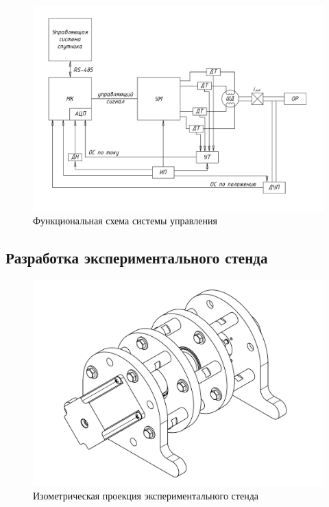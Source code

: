 \begin{figure}
    \centering
    \includegraphics[width=\linewidth, keepaspectratio,
                    clip=true, trim=21mm 21mm 21mm 20mm]
                    {src/pictures/functional_scheme_real}
    \caption{Функциональная схема системы управления}
    \label{pic_functional_scheme}
\end{figure}



\newpage
\subsection{Разработка экспериментального стенда}
\label{sec_stand_construction}


\begin{figure}[ht]
    \centering
    \includegraphics[width=\textwidth, scale=0.6, keepaspectratio]
                    {src/pictures/stand}
    \caption{Изометрическая проекция экспериментального стенда}
    \label{pic_stand}
\end{figure}

